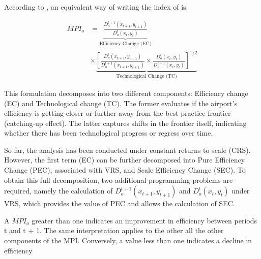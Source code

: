 According to \cite{fare1994},  an equivalent way of writing the index of  is:
\vspace{-0.5cm}

\begin{equation}
\label{eq:MPI}
\begin{aligned}
MPI_{o} &= \underbrace{\frac{D^{t+1}_{o}(x_{t+1}, y_{t+1})}{D^{t}_{o}(x_{t}, y_{t})}}_{\text{Efficiency Change (EC)}} \\
&\times \underbrace{\left[ 
\frac{D^{t}_{o}(x_{t+1}, y_{t+1})}{D^{t+1}_{o}(x_{t+1}, y_{t+1})} 
\times 
\frac{D^{t}_{o}(x_{t}, y_{t})}{D^{t+1}_{o}(x_{t}, y_{t})} 
\right]^{1/2}}_{\text{Technological Change (TC)}}
\end{aligned}
\end{equation}


This formulation decomposes  into two different components: Efficiency change (EC)
and Technological change (TC). The former evaluates if the airport’s efficiency is getting closer or further
away from the best practice frontier (catching-up effect). The latter captures shifts in the frontier itself,
indicating whether there has been technological progress or regress over time.

So far, the analysis has been conducted under constant returns to scale (CRS). However, the first
term (EC) can be further decomposed into Pure Efficiency Change (PEC), associated with VRS, and
Scale Efficiency Change (SEC). To obtain this full decomposition, two additional programming problems are required, namely the calculation of $D^{t+1}_{o}(x_{t+1}, y_{t+1})$ and $D^{t}_{o}(x_{t}, y_{t})$ under VRS, which provides the value of PEC and allows
the calculation of SEC.

A $MPI_{o}$ greater than one indicates an improvement in efficiency between periods t and t + 1. The
same interpretation applies to the other all the other components of the MPI. Conversely, a value less
than one indicates a decline in efficiency